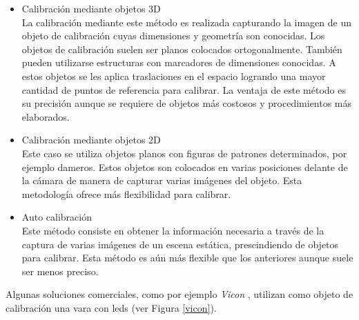 \begin{itemize}
\item Calibración mediante objetos 3D\\

La calibración mediante este método es realizada capturando la imagen de un objeto de calibración cuyas dimensiones y geometría son conocidas. Los objetos de calibración suelen ser planos colocados ortogonalmente. También pueden utilizarse estructuras con marcadores de dimensiones conocidas. A estos objetos se les aplica traslaciones en el espacio logrando una mayor cantidad de puntos de referencia para calibrar. La ventaja de este método es su precisión aunque se requiere de objetos más costosos y procedimientos más elaborados.\\

\item Calibración mediante objetos 2D\\

Este caso se utiliza objetos planos con figuras de patrones determinados, por ejemplo dameros. Estos objetos son colocados en varias posiciones delante de la cámara de manera de capturar varias imágenes del objeto. Esta metodología ofrece más flexibilidad para calibrar.\\

\item Auto calibración\\

Este método consiste en obtener la información necesaria a través de la captura de varias imágenes de un escena estática, prescindiendo de objetos para calibrar. Esta método es aún más flexible que los anteriores aunque suele ser menos preciso.\\

\end{itemize}


Algunas soluciones comerciales, como por ejemplo \emph{Vicon} \cite{vicon}, utilizan como objeto de calibración una vara con leds (ver Figura \ref{vicon}). 

